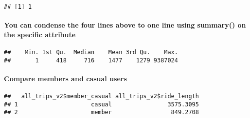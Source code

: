 \documentclass[
]{article}
\newenvironment{Shaded}{\begin{snugshade}}{\end{snugshade}}
\newcommand{\AttributeTok}[1]{\textcolor[rgb]{0.77,0.63,0.00}{#1}}
\newcommand{\FunctionTok}[1]{\textcolor[rgb]{0.00,0.00,0.00}{#1}}
\newcommand{\NormalTok}[1]{#1}
\newcommand{\SpecialCharTok}[1]{\textcolor[rgb]{0.00,0.00,0.00}{#1}}
\begin{document}
\begin{verbatim}
## [1] 1
\end{verbatim}

\hypertarget{you-can-condense-the-four-lines-above-to-one-line-using-summary-on-the-specific-attribute}{%
\paragraph{You can condense the four lines above to one line using
summary() on the specific
attribute}\label{you-can-condense-the-four-lines-above-to-one-line-using-summary-on-the-specific-attribute}}

\begin{Shaded}
\end{Shaded}

\begin{verbatim}
##    Min. 1st Qu.  Median    Mean 3rd Qu.    Max. 
##       1     418     716    1477    1279 9387024
\end{verbatim}

\hypertarget{compare-members-and-casual-users}{%
\paragraph{Compare members and casual
users}\label{compare-members-and-casual-users}}

\begin{Shaded}
\end{Shaded}

\begin{verbatim}
##   all_trips_v2$member_casual all_trips_v2$ride_length
## 1                     casual                3575.3095
## 2                     member                 849.2708
\end{verbatim}

\begin{Shaded}
\end{Shaded}
\end{document}
